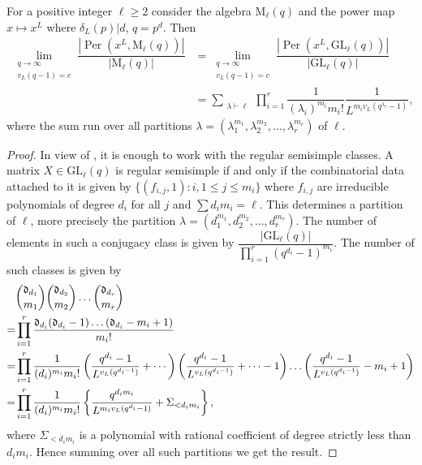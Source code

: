 \documentclass[11pt,twoside]{amsart}
\newcommand{\GL}{\mathrm{GL}}
\newcommand{\M}{\mathrm{M}}
\newcommand{\per}{\operatorname{Per}}
\renewcommand{\d}{\mathfrak d}
\theoremstyle{definition} %
\begin{document}
\begin{theorem}\label{thm:GL}
    For a positive integer $\ell\geq2$ consider the algebra $\M_\ell(q)$ and the power map $x\mapsto x^L$ where $\delta_L(p)|d$, $q=p^d$. 
    Then
    \begin{align*}
        \lim\limits_{\substack{q\longrightarrow \infty\\v_L(q-1)=c}}\dfrac{\left|\per(x^L,\M_\ell(q))\right|}{|\M_\ell(q)|}
    &=    \lim\limits_{\substack{q\longrightarrow \infty\\
    v_L(q-1)=c}}\dfrac{\left|\per(x^L,\GL_\ell(q))\right|}{|\GL_\ell(q)|}\\
    &=\sum\limits_{\substack{\lambda\vdash \ell}}\prod\limits_{i=1}^{r}\dfrac{1}{(\lambda_i)^{m_i}m_i!}\dfrac{1}{L^{m_iv_L(q^{\lambda_i}-1)}},
    \end{align*}
    where the sum run over all partitions $\lambda=(\lambda_1^{m_1},\lambda_2^{m_2},\ldots,\lambda_r^{m_r})$ of $\ell$.
\end{theorem}
\begin{proof}
    In view of , it is enough to work with the regular semisimple classes. 
    A matrix $X\in \GL_\ell(q)$ is regular semisimple if and only if the combinatorial data attached to it is given by $\{(f_{i,j},1): i, 1\leq j\leq m_i\}$ where $f_{i,j}$ are irreducible polynomials of degree $d_i$ for all $j$ and $\sum\limits d_i m_i=\ell$.
    This determines a partition of $\ell$, more precisely the partition $\lambda=(d_1^{m_1},d_2^{m_2},\ldots, d_r^{m_r})$.
    The number of elements in such a conjugacy class is given by
    $\dfrac{|\GL_\ell(q)|}{\prod\limits_{i=1}^{r}(q^{d_i}-1)^{m_i}}$.
    The number of such classes is given by
    \begin{align*}
        &\dbinom{\d_{d_1}}{m_1}\dbinom{\d_{d_2}}{m_2}\ldots\dbinom{\d_{d_r}}{m_r}\\
        =&\prod\limits_{i=1}^r\dfrac{\d_{d_i}(\d_{d_i}-1)\ldots (\d_{d_i}-m_i+1)}{m_i!}\\
        =&\prod\limits_{i=1}^r \dfrac{1}{(d_i)^{m_i}m_i!}\left(\dfrac{q^{d_i}-1}{L^{v_L(q^{d_i-1})}}+\cdots\right)\left(\dfrac{q^{d_i}-1}{L^{v_L(q^{d_i-1})}}+\cdots-1\right)
        \ldots \left(\dfrac{q^{d_i}-1}{L^{v_L(q^{d_i-1})}}-m_i+1\right)\\
        =&\prod\limits_{i=1}^r\dfrac{1}{(d_i)^{m_i}m_i!}\left\{\dfrac{q^{d_im_i}}{L^{m_iv_L(q^{d_i}-1)}}+\Sigma_{<d_im_i}\right\},
    \end{align*}
    where $\Sigma_{<d_im_i}$ is a polynomial with rational coefficient of degree strictly less than $d_im_i$.
    Hence summing over all such partitions we get the result.
\end{proof}
\end{document}
